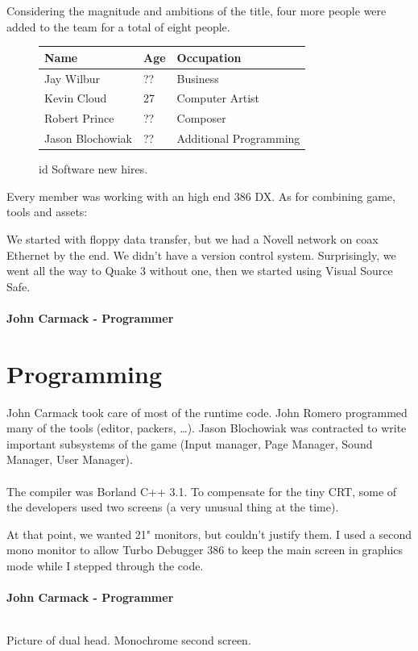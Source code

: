 \documentclass[book.tex]{subfiles}
\begin{document}
Considering the magnitude and ambitions of the title, four more people were added to the team for a total of eight people.\\

 \begin{figure}[H]
\centering  
\begin{tabularx}{\textwidth}{ X  X  X  }
  \toprule
  \textbf{Name} &  \textbf{Age} & \textbf{Occupation} \\
  \toprule 
   Jay Wilbur & ?? &  Business\\
   Kevin Cloud & 27 &  Computer Artist\\
   Robert Prince & ?? &  Composer\\
   Jason Blochowiak & ?? &  Additional Programming\\
     \toprule
\end{tabularx}
\caption{id Software new hires.}\label{fig:Id Software hires}
\end{figure}

Every member was working with an high end 386 DX. As for combining game, tools and assets:\\

 \begin{fancyquotes}
We started with floppy data transfer, but we had a Novell network on coax Ethernet by the end. We didn't have a version control system.  Surprisingly, we went all the way to Quake 3 without one, then we started using Visual Source Safe.\\
 \\
\textbf{John Carmack - Programmer}
\end{fancyquotes}
\section{Programming}

John Carmack took care of most of the runtime code. John Romero programmed many of the tools (editor, packers, …). Jason Blochowiak was contracted to write important subsystems of the game (Input manager, Page Manager, Sound Manager, User Manager).\\
\\
The compiler was Borland C++ 3.1. To compensate for the tiny CRT, some of the developers used two screens (a very unusual thing at the time).\\
\begin{fancyquotes}
At that point, we wanted 21" monitors, but couldn't justify them.  I used a second mono monitor to allow Turbo Debugger 386 to keep the main screen in graphics mode while I stepped through the code.\\
 \\
\textbf{John Carmack - Programmer}
\end{fancyquotes}
\\
Picture of dual head. Monochrome second screen.
\end{document}
